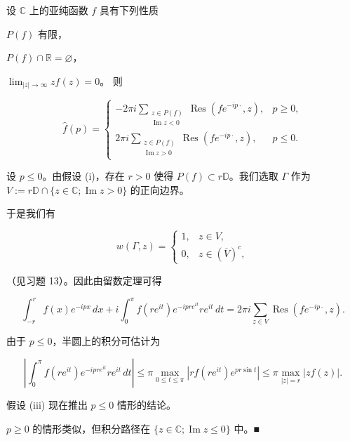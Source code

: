 \begin{proposition}

设 $ \mathbb{C} $ 上的亚纯函数 $ f $ 具有下列性质

\begin{subitems}
\item

$ P(f) $ 有限，

\item

$ P(f)\cap\mathbb{R} = \varnothing $，

\item

$ \lim_{|z|\to\infty}zf(z) = 0 $。
则

\begin{equation*}
\widehat{f}(p) = \begin{cases} -2\pi i\sum_{\substack{z\in P(f) \\ \operatorname{Im} z < 0}}\operatorname{Res}(f e^{-ip\cdot},z) , & p \ge 0 , \\ 2\pi i\sum_{\substack{z\in P(f) \\ \operatorname{Im} z > 0}}\operatorname{Res}(f e^{-ip\cdot},z) , & p \le 0 . \end{cases}
\end{equation*}

\proofhead
设 $ p \le 0 $。由假设 (i)，存在 $ r > 0 $ 使得 $ P(f) \subset r\mathbb{D} $。我们选取 $ \Gamma $ 作为 $ V := r\mathbb{D}\cap\{z \in \mathbb{C} ; \operatorname{Im} z > 0\} $ 的正向边界。
\end{subitems}


于是我们有

\begin{equation*}
w(\Gamma,z) = \begin{cases} 1 , & z \in V , \\ 0 , & z \in \left(\overline{V}\right)^{c} , \end{cases}
\end{equation*}

（见习题 13）。因此由留数定理可得

\[
\int_{-r}^{r}f(x)e^{-ipx}\,dx + i\int_{0}^{\pi}f(re^{it})e^{-ipre^{it}}re^{it}\,dt = 2\pi i\sum_{z\in V}\operatorname{Res}(f e^{-ip\cdot},z) .
\]

由于 $ p \le 0 $，半圆上的积分可估计为

\[
\left|\int_{0}^{\pi}f(re^{it})e^{-ipre^{it}}re^{it}\,dt\right| \le \pi\max_{0\le t\le\pi}\left|rf(re^{it})e^{pr\sin t}\right| \le \pi\max_{|z|=r}|zf(z)| .
\]

假设 (iii) 现在推出 $ p \le 0 $ 情形的结论。

$ p \ge 0 $ 的情形类似，但积分路径在 $ \{z \in \mathbb{C} ; \operatorname{Im} z \le 0\} $ 中。\nobreak\hspace{0.35em}■

\end{proposition}

